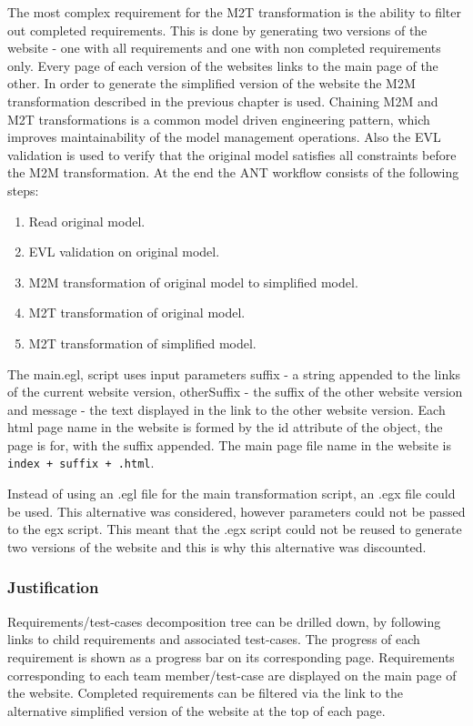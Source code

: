 \documentclass[11pt,a4paper]{article}
\begin{document}
	The most complex requirement for the M2T transformation is the ability to filter out completed requirements. This is done by generating two versions of the website - one with all requirements and one with non completed requirements only. Every page of each version of the websites links to the main page of the other. In order to generate the simplified version of the website the M2M transformation described in the previous chapter is used. Chaining M2M and M2T transformations is a common model driven engineering pattern, which improves maintainability of the model management operations. Also the EVL validation is used to verify that the original model satisfies all constraints before the M2M transformation. At the end the ANT workflow consists of the following steps:
	
	\begin{enumerate}[noitemsep]
		\item Read original model.
		\item EVL validation on original model.
		\item M2M transformation of original model to simplified model.
		\item M2T transformation of original model.
		\item M2T transformation of simplified model.
	\end{enumerate}
	
	The main.egl, script uses input parameters suffix -  a string appended to the links of the current website version, otherSuffix - the suffix of the other website version and message - the text displayed in the link to the other website version. Each html page name in the website is formed by the id attribute of the object, the page is for, with the suffix appended. The main page file name in the website is \texttt{index + suffix + .html}.
	
	Instead of using an .egl file for the main transformation script, an .egx file could be used. This alternative was considered, however parameters could not be passed to the egx script. This meant that the .egx script could not be reused to generate two versions of the website and this is why this alternative was discounted.
	
	\subsubsection{Justification}
	Requirements/test-cases decomposition tree can be drilled down, by following links to child requirements and associated test-cases. 	The progress of each requirement is shown as a progress bar on its corresponding page. Requirements corresponding to each team member/test-case are displayed on the main page of the website. Completed requirements can be filtered via the link to the alternative simplified version of the website at the top of each page.
	
\end{document}
